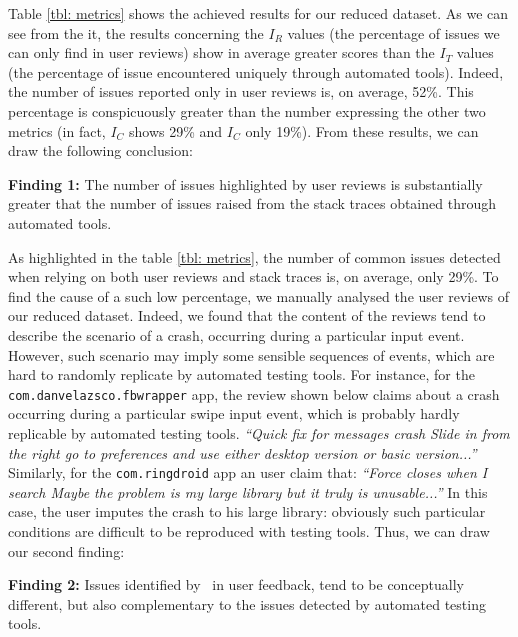 Table \ref{tbl: metrics} shows the achieved results for our reduced dataset. 
As we can see from the it, the results concerning the $I_R$ values (\ie the percentage of issues we can only find in user reviews) show in average greater scores than the $I_T$ values (\ie the percentage of issue encountered uniquely through automated tools).
Indeed, the number of issues reported only in user reviews is, on average, 52\%. This percentage is conspicuously greater than the number expressing the other two metrics (in fact, $I_C$ shows 29\% and $I_C$ only 19\%). 
From these results, we can draw the following conclusion: 
\smallbreak
\begin{tcolorbox}[colback=white, size=small]
{\small
\textbf{Finding 1:}   The number of issues highlighted 
 by user reviews is substantially greater that the number of issues raised from the stack traces obtained through automated tools.}
 \end{tcolorbox}



As highlighted in the table \ref{tbl: metrics}, the number of common issues detected when relying on both user reviews and stack traces is, on average, only 29\%. 
To find the cause of a such low percentage, we manually analysed the user reviews of our reduced dataset. 
Indeed, we found that the content of the reviews tend to describe the scenario of a crash, occurring during a particular input event.
However, such scenario may imply some sensible sequences of events, which are hard to randomly replicate by automated testing tools. 
For instance, for the \texttt{com.danvelazsco.fbwrapper} app, the review shown below claims about a crash occurring during a particular swipe input event, which is probably hardly replicable by automated testing tools. 
\smallbreak
\emph{\small``Quick fix for messages crash Slide in from the right go to preferences and use either desktop version or basic version...''}
\smallbreak
Similarly, for the \texttt{com.ringdroid} app an user claim that:
\smallbreak
\emph{\small``Force closes when I search Maybe the problem is my large library but it truly is unusable...''}
\smallbreak
In this case, the user imputes the crash to his large library: obviously such particular conditions are difficult to be reproduced with testing tools.
Thus, we can draw our second finding: 




\smallbreak
\begin{tcolorbox}[colback=white, size=small]
{\small 
\textbf{Finding 2:}  Issues identified by \toolname\ in user feedback, tend to be conceptually different, but also complementary to the issues detected by automated testing tools.}
\end{tcolorbox}

